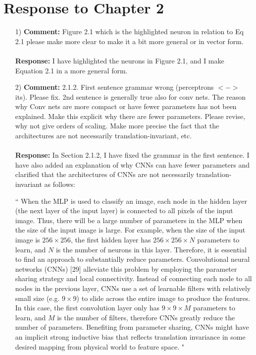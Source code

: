 \documentclass[11pt]{article}
\begin{document}
\section*{Response to Chapter 2}
\begin{enumerate}
\item[1)] \textbf{Comment:} Figure 2.1 which is the highlighted neuron in relation to Eq 2.1 please make more clear to make it a bit more general or in vector form.\\ \\
\textbf{Response:} I have highlighted the neurons in Figure 2.1, and I make Equation 2.1 in a more general form.
\item[2)] \textbf{Comment:} 2.1.2. First sentence grammar wrong (perceptrons $<->$ its). Please fix. 2nd sentence is generally true also for conv nets. The reason why Conv nets are more compact or have fewer parameters has not been explained. Make this explicit why there are fewer parameters. Please revise, why not give orders of scaling.
Make more precise the fact that the architectures are not necessarily translation-invariant, etc. \\ \\
\textbf{Response:} In Section 2.1.2, I have fixed the grammar in the first sentence. I have also added an explanation of why CNNs can have fewer parameters and clarified that the architectures of CNNs are not necessarily translation-invariant as follows:

``
When the MLP is used to classify an image, each node in the hidden layer (the next layer of the input layer) is connected to all pixels of the input image. Thus, there will be a large number of parameters in the MLP when the size of the input image is large. For example, when the size of the input image is $256\times256$, the first hidden layer has $256\times256\times N$ parameters to learn, and $N$ is the number of neurons in this layer. Therefore, it is essential to find an approach to substantially reduce parameters. Convolutional neural networks (CNNs) [29] alleviate this problem by employing the parameter sharing strategy and local connectivity. Instead of connecting each node to all nodes in the previous layer, CNNs use a set of learnable filters with relatively small size (e.g. $9\times9$) to slide across the entire image to produce the features. In this case, the first convolution layer only has $9\times9\times M$ parameters to learn, and $M$ is the number of filters, therefore CNNs greatly reduce the number of parameters. Benefiting from parameter sharing, CNNs might have an implicit strong inductive bias that reflects translation invariance in some desired mapping from physical world to feature space.
"


\end{enumerate}
\end{document}

